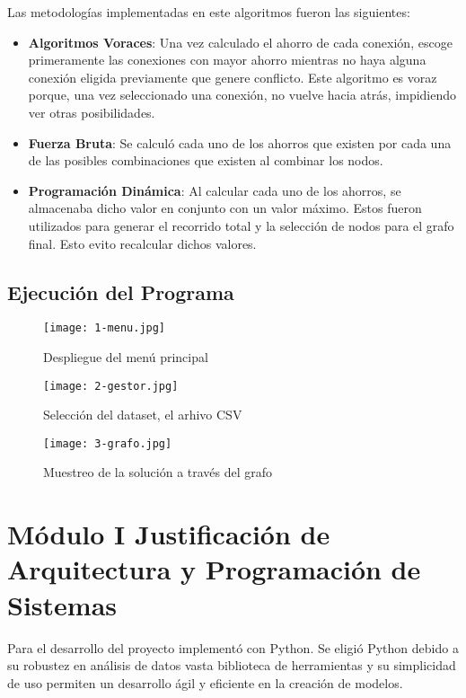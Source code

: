\documentclass[10pt,twocolumn,letterpaper]{article}
\begin{document}
Las metodologías implementadas en este algoritmos fueron las siguientes:
\begin{itemize}
	\item \textbf{Algoritmos Voraces}: Una vez calculado el ahorro de cada conexión, escoge primeramente las conexiones con mayor ahorro mientras no haya alguna conexión eligida previamente que genere conflicto. Este algoritmo es voraz porque, una vez seleccionado una conexión, no vuelve hacia atrás, impidiendo ver otras posibilidades.
	\item \textbf{Fuerza Bruta}: Se calculó cada uno de los ahorros que existen por cada una de las posibles combinaciones que existen al combinar los nodos.
	\item \textbf{Programación Dinámica}: Al calcular cada uno de los ahorros, se almacenaba dicho valor en conjunto con un valor máximo. Estos fueron utilizados para generar el recorrido total y la selección de nodos para el grafo final. Esto evito recalcular dichos valores.
\end{itemize}

\subsection{Ejecución del Programa}

\begin{figure}[h]
  \centering
  \texttt{[image: 1-menu.jpg]}
  \caption{Despliegue del menú principal}
\end{figure}

\begin{figure}[h]
  \centering
  \texttt{[image: 2-gestor.jpg]}
  \caption{Selección del dataset, el arhivo CSV}
\end{figure}

\begin{figure}[h]
  \centering
  \texttt{[image: 3-grafo.jpg]}
  \caption{Muestreo de la solución a través del grafo}
\end{figure}

\section*{Módulo I Justificación de Arquitectura y Programación de Sistemas}
Para el desarrollo del proyecto implementó con Python. Se eligió Python debido a su robustez en análisis de datos vasta biblioteca de herramientas y su simplicidad de uso permiten un desarrollo ágil y eficiente en la creación de modelos.\\
\end{document}
